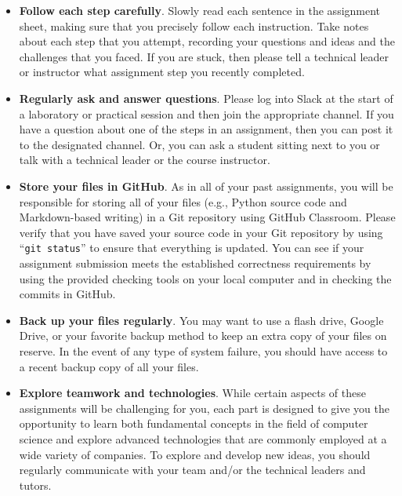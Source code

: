 \documentclass[11pt]{article}
\newcommand{\command}[1]{``\lstinline{#1}''}
\begin{document}
\begin{itemize}
  \setlength{\itemsep}{0pt}

\item {\bf Follow each step carefully}. Slowly read each sentence in the
  assignment sheet, making sure that you precisely follow each instruction.
  Take notes about each step that you attempt, recording your questions and
  ideas and the challenges that you faced. If you are stuck, then please tell a
  technical leader or instructor what assignment step you recently completed.

\item {\bf Regularly ask and answer questions}. Please log into Slack at the
  start of a laboratory or practical session and then join the appropriate
  channel. If you have a question about one of the steps in an assignment, then
  you can post it to the designated channel. Or, you can ask a student sitting
  next to you or talk with a technical leader or the course instructor.

\item {\bf Store your files in GitHub}. As in all of your past assignments, you
  will be responsible for storing all of your files (e.g., Python source code and
  Markdown-based writing) in a Git repository using GitHub Classroom. Please
  verify that you have saved your source code in your Git repository by using
  \command{git status} to ensure that everything is updated. You can see if
  your assignment submission meets the established correctness requirements by
  using the provided checking tools on your local computer and in checking the
  commits in GitHub.


\item {\bf Back up your files regularly}. You may want to use a flash drive,
  Google Drive, or your favorite backup method to keep an extra copy of your
  files on reserve. In the event of any type of system failure, you should have
  access to a recent backup copy of all your files.

\item {\bf Explore teamwork and technologies}. While certain aspects of these
  assignments will be challenging for you, each part is designed to give you the
  opportunity to learn both fundamental concepts in the field of computer
  science and explore advanced technologies that are commonly employed at a wide
  variety of companies. To explore and develop new ideas, you should regularly
  communicate with your team and/or the technical leaders and tutors.


\end{itemize}
\end{document}
